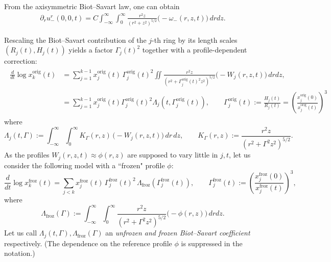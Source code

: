 \documentclass[reqno,11pt]{amsart}
\begin{document}
From the axisymmetric Biot--Savart law, one can obtain
    \begin{align*}
        \partial_r u^{r}_- (0,0,t)
    =
        C\int_{-\infty}^\infty \int _0^\infty \frac{r^2z}{(r^2+z^2)^{5/2}} \big(-\omega_-(r,z,t)\big) \, dr dz.
    \end{align*}

Rescaling the Biot--Savart contribution of the $j$-th ring by its length scales
$(R_j(t),H_j(t))$ yields a factor $\Gamma_j(t)^2$ together with a
profile-dependent correction:
\begin{align}
\label{original_ODEs}
\begin{aligned}
    \frac{d}{dt}\log x_k^{\mathrm{orig}}(t)
    &=
    \sum_{j=1}^{k-1} x_j^{\mathrm{orig}}(t)\,\Gamma_j^{\mathrm{orig}}(t)^2
    \iint \frac{r^2 z}{(r^2+\Gamma_j^{\mathrm{orig}}(t)^2 z^2)^{5/2}} \big( -W_j(r,z,t) \big)\, drdz, 
    \\
    &=\sum_{j=1}^{k-1}
    x_j^{\mathrm{orig}}(t) \Gamma_j^{\mathrm{orig}}(t)^2 \Lambda_j (t,\Gamma_j^{\mathrm{orig}}(t)),
    \qquad
    \Gamma_j^{\mathrm{orig}}(t):=
    \frac{H_j(t)}{R_j(t)}
    =
    \left(
    \frac{x_j^{\mathrm{orig}}(0)}{x_j^{\mathrm{orig}}(t)}
    \right)^3
\end{aligned}
\end{align}
where
\begin{equation*}
\Lambda_j(t,\Gamma)
:=\int_{-\infty}^\infty \int_{0}^\infty
K_\Gamma(r,z)\,\big( - W_j(r,z,t) \big)\,dr\,dz,
\qquad
K_\Gamma(r,z):=\frac{r^2 z}{(r^2+\Gamma^2 z^2)^{5/2}}.
\end{equation*}
As the profiles $W_j(r,z,t)\approx \phi(r,z)$ are supposed to vary little in $j,t$, let us consider the following model with a ``frozen" profile $\phi$:
\begin{equation}
\label{ode_full}
    \frac{d}{dt}\log x_k^{\mathrm{froz}}(t)
    =
    \sum_{j<k} x_j^{\mathrm{froz}}(t)\,\Gamma_j^{\mathrm{froz}}(t)^2\,\Lambda_{\mathrm{froz}}(\Gamma_j^{\mathrm{froz}}(t)),
    \qquad \Gamma_j^{\mathrm{froz}}(t)
    :=\left(
        \frac{x_j^{\mathrm{froz}}(0)}{x_j^{\mathrm{froz}}(t)}
    \right)^3,
\end{equation}
where
\begin{equation*}
    \Lambda_{\mathrm{froz}}(\Gamma)
    :=
    \int_{-\infty}^\infty \int _{0}^\infty
    \frac{r^2 z}{(r^2+\Gamma^2 z^2)^{5/2}}
    \big( -\phi(r,z) \big)\,drdz.
\end{equation*}
Let us call $\Lambda_j(t,\Gamma),\Lambda_{\mathrm{froz}}(\Gamma)$ an \emph{unfrozen and frozen Biot--Savart coefficient} respectively.
(The dependence on the reference profile $\phi$ is suppressed in the notation.)
\end{document}
